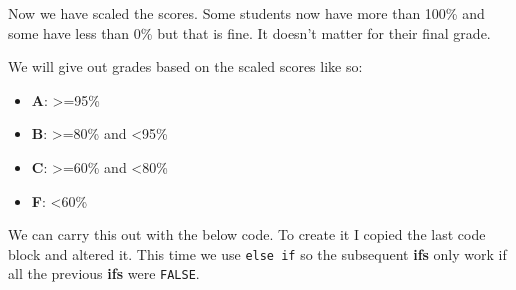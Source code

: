 \documentclass[]{book}
\providecommand{\tightlist}{%
  \setlength{\itemsep}{0pt}\setlength{\parskip}{0pt}}
\begin{document}
Now we have scaled the scores. Some students now have more than 100\%
and some have less than 0\% but that is fine. It doesn't matter for
their final grade.

We will give out grades based on the scaled scores like so:

\begin{itemize}
\tightlist
\item
  \textbf{A}: \textgreater{}=95\%
\item
  \textbf{B}: \textgreater{}=80\% and \textless{}95\%
\item
  \textbf{C}: \textgreater{}=60\% and \textless{}80\%
\item
  \textbf{F}: \textless{}60\%
\end{itemize}

We can carry this out with the below code. To create it I copied the
last code block and altered it. This time we use \texttt{else\ if} so
the subsequent \textbf{ifs} only work if all the previous \textbf{ifs}
were \texttt{FALSE}.
\end{document}
